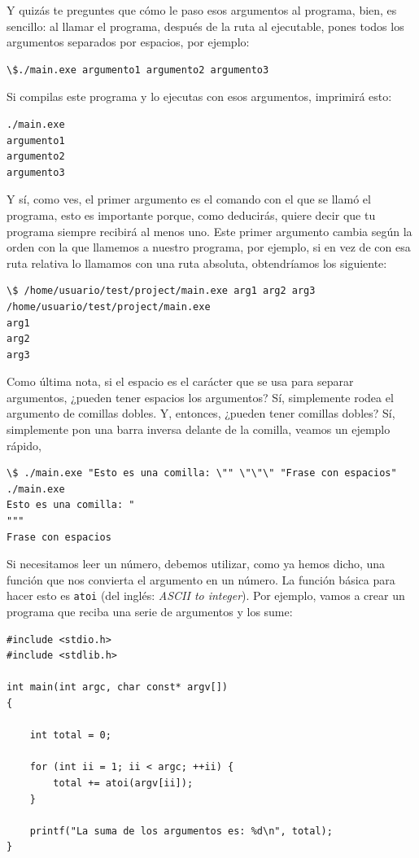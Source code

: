 \documentclass[a4paper]{article}
\begin{document}
Y quizás te preguntes que cómo le paso esos argumentos al programa, bien, es
sencillo: al llamar el programa, después de la ruta al ejecutable, pones
todos los argumentos separados por espacios, por ejemplo:
\begin{lstlisting}[style=terminalStyle]
\$./main.exe argumento1 argumento2 argumento3
\end{lstlisting}
Si compilas este programa y lo ejecutas con esos argumentos, imprimirá esto:

\begin{lstlisting}[style=terminalStyle]
./main.exe
argumento1
argumento2
argumento3
\end{lstlisting}

Y sí, como ves, el primer argumento es el comando con el que se llamó el
programa, esto es importante porque, como deducirás, quiere decir que tu
programa siempre recibirá al menos uno. Este primer argumento cambia según la
orden con la que llamemos a nuestro programa, por ejemplo, si en vez de con
esa ruta relativa lo llamamos con una ruta absoluta, obtendríamos los siguiente:
\begin{lstlisting}[style=terminalStyle]
\$ /home/usuario/test/project/main.exe arg1 arg2 arg3
/home/usuario/test/project/main.exe
arg1
arg2
arg3
\end{lstlisting}

Como última nota, si el espacio es el carácter que se usa para separar
argumentos, ¿pueden tener espacios los argumentos? Sí, simplemente rodea el
argumento de comillas dobles. Y, entonces, ¿pueden tener comillas dobles? Sí,
simplemente pon una barra inversa delante de la comilla, veamos un ejemplo
rápido,
\begin{lstlisting}[style=terminalStyle]
\$ ./main.exe "Esto es una comilla: \"" \"\"\" "Frase con espacios"
./main.exe
Esto es una comilla: "
"""
Frase con espacios
\end{lstlisting}

Si necesitamos leer un número, debemos utilizar, como ya hemos dicho, una
función que nos convierta el argumento en un número. La función básica para
hacer esto es \verb!atoi! (del inglés: \emph{ASCII to integer}). Por ejemplo,
vamos a crear un programa que reciba una serie de argumentos y los sume:

\noindent
\begin{minipage}[H]{\linewidth}
\mbox{}
\begin{lstlisting}[style=C,
caption={Programa que suma argumentos},
label={lst:sumArgs}]
#include <stdio.h>
#include <stdlib.h>

int main(int argc, char const* argv[])
{

    int total = 0;

    for (int ii = 1; ii < argc; ++ii) {
        total += atoi(argv[ii]);
    }

    printf("La suma de los argumentos es: %d\n", total);
}
\end{lstlisting}
\end{minipage}
\end{document}
